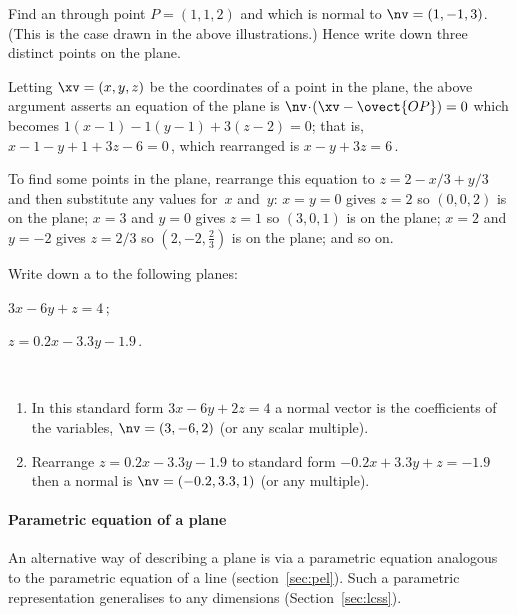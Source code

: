 \begin{example} \label{eg:}
Find an  through point \(P=(1,1,2)\) and which is normal to \(\nv=(1,-1,3)\).
(This is the case drawn in the above illustrations.)
Hence write down three distinct points on the plane.
\begin{solution} 
Letting \(\xv=(x,y,z)\) be the coordinates of a point in the plane, the above argument asserts an equation of the plane is \(\nv\cdot(\xv-\ovect{OP})=0\) which becomes
\(1(x-1)-1(y-1)+3(z-2)=0\); that is, \(x-1-y+1+3z-6=0\)\,, which rearranged is \(x-y+3z=6\)\,. 

To find some points in the plane, rearrange this equation to \(z=2-x/3+y/3\) and then substitute any values for~\(x\) and~\(y\):  
\(x=y=0\) gives \(z=2\) so \((0,0,2)\) is on the plane; 
\(x=3\) and \(y=0\) gives \(z=1\) so \((3,0,1)\) is on the plane;
\(x=2\) and \(y=-2\) gives \(z=2/3\) so \((2,-2,\frac23)\) is on the plane; and so on.
\end{solution}
\end{example}





\begin{example} \label{eg:}
Write down a  to the following planes:
\begin{parts}
\item \(3x-6y+z=4\)\,;
\item \(z=0.2x-3.3y-1.9\)\,.
\end{parts}
\begin{solution} \ 
\begin{enumerate}
\item In this standard form \(3x-6y+2z=4\) a normal vector is the coefficients of the variables, \(\nv=(3,-6,2)\) (or any scalar multiple).
\item Rearrange \(z=0.2x-3.3y-1.9\) to standard form \(-0.2x+3.3y+z=-1.9\) then a normal is \(\nv=(-0.2,3.3,1)\) (or any multiple).
\end{enumerate} 
\end{solution}
\end{example}





\paragraph{Parametric equation of a plane}
An alternative way of describing a plane is via a parametric equation analogous to the parametric equation of a line (section~\ref{sec:pel}).
Such a parametric representation generalises to any dimensions (Section~\ref{sec:lcss}).

